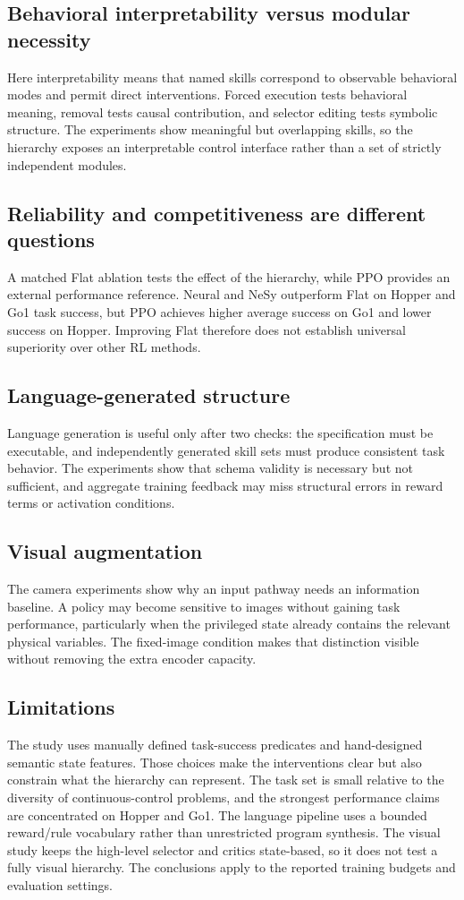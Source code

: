 \documentclass[conference,letterpaper,10pt]{IEEEtran}
\begin{document}
\subsection{Behavioral interpretability versus modular necessity}
Here interpretability means that named skills correspond to observable behavioral modes and permit direct interventions. Forced execution tests behavioral meaning, removal tests causal contribution, and selector editing tests symbolic structure. The experiments show meaningful but overlapping skills, so the hierarchy exposes an interpretable control interface rather than a set of strictly independent modules.

\subsection{Reliability and competitiveness are different questions}
A matched Flat ablation tests the effect of the hierarchy, while PPO provides an external performance reference. Neural and NeSy outperform Flat on Hopper and Go1 task success, but PPO achieves higher average success on Go1 and lower success on Hopper. Improving Flat therefore does not establish universal superiority over other RL methods.

\subsection{Language-generated structure}
Language generation is useful only after two checks: the specification must be executable, and independently generated skill sets must produce consistent task behavior. The experiments show that schema validity is necessary but not sufficient, and aggregate training feedback may miss structural errors in reward terms or activation conditions.

\subsection{Visual augmentation}
The camera experiments show why an input pathway needs an information baseline. A policy may become sensitive to images without gaining task performance, particularly when the privileged state already contains the relevant physical variables. The fixed-image condition makes that distinction visible without removing the extra encoder capacity.

\subsection{Limitations}
The study uses manually defined task-success predicates and hand-designed semantic state features. Those choices make the interventions clear but also constrain what the hierarchy can represent. The task set is small relative to the diversity of continuous-control problems, and the strongest performance claims are concentrated on Hopper and Go1. The language pipeline uses a bounded reward/rule vocabulary rather than unrestricted program synthesis. The visual study keeps the high-level selector and critics state-based, so it does not test a fully visual hierarchy. The conclusions apply to the reported training budgets and evaluation settings.
\end{document}
